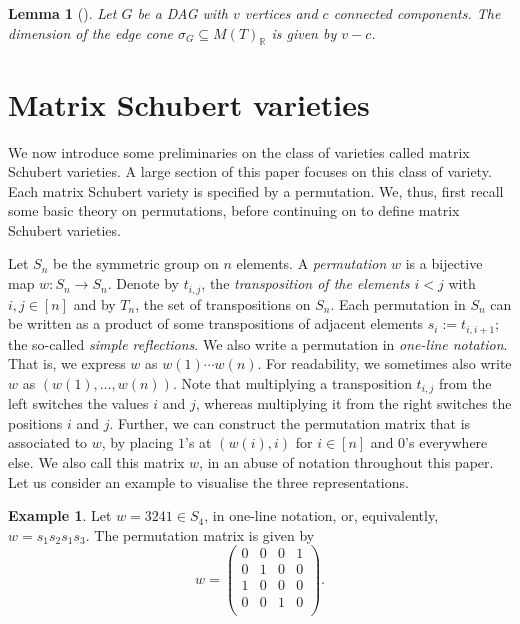 \documentclass[11pt]{amsart}
\newtheorem{lemma}[theorem]{Lemma}
\theoremstyle{definition}
\newtheorem{example}[theorem]{Example}
\theoremstyle{definition}
\theoremstyle{definition}
\theoremstyle{definition}
\begin{document}
\begin{lemma}[\cite{donten2021complexity}]\label{lem:weightcondim}
    Let $G$ be a DAG with $v$ vertices and $c$ connected components. The dimension of the edge cone $\sigma_G \subseteq M(T)_{\mathbb R}$ is given by $v-c$.
\end{lemma}


\section{Matrix Schubert varieties}\label{sec: MS varieties}

\noindent We now introduce some preliminaries on the class of varieties called matrix Schubert varieties. A large section of this paper focuses on this class of variety. Each matrix Schubert variety is specified by a permutation. We, thus, first recall some basic theory on permutations, before continuing on to define matrix Schubert varieties. 

Let $S_n$ be the symmetric group on $n$ elements. A \emph{permutation} $w$ is a bijective map $w: S_n\rightarrow S_n$. Denote by $t_{i,j}$, the \emph{transposition of the elements $i<j$} with $i,j\in[n]$ and by $T_n$, the set of transpositions on $S_n$. Each permutation in $S_n$ can be written as a product of some transpositions of adjacent elements $s_i := t_{i,i+1}$; the so-called \emph{simple reflections}. We also write a permutation in \emph{one-line notation}. That is, we express $w$ as $w(1)\cdots w(n)$. For readability, we sometimes also write $w$ as $(w(1), \ldots, w(n))$. Note that multiplying a transposition $t_{i,j}$ from the left switches the values $i$ and $j$, whereas multiplying it from the right switches the positions $i$ and $j$. Further, we can construct the permutation matrix that is associated to $w$, by placing $1$'s at $(w(i),i)$ for $i\in[n]$ and $0$'s everywhere else. We also call this matrix $w$, in an abuse of notation throughout this paper.
Let us consider an example to visualise the three representations.

\begin{example}
    Let $w=3241 \in S_4$, in one-line notation, or, equivalently, $w = s_1s_2s_1s_3$. The permutation matrix is given by
    $$w = \left(\begin{array}{cccc}
       0 & 0 & 0 & 1 \\
       0 & 1 & 0 & 0 \\
       1 & 0 & 0 & 0 \\
       0 & 0 & 1 & 0 \\       
    \end{array}\right).$$
\end{example}
\end{document}
